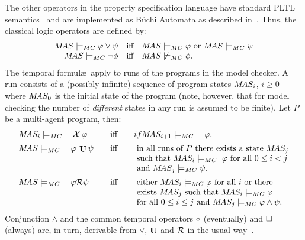 \noindent The other operators in the \ajpf{} property specification
language have standard PLTL semantics~\cite{emerson:90a} and are
implemented as B\"{u}chi Automata as described
in~\cite{Gerth:1995:SOA:645837.670574,Courcoubetis92mea}. Thus, the
classical logic operators are defined by:
$$
\begin{array}{rcl}
  M\!AS \models_{MC} \varphi \vee \psi &\text{iff}& M\!AS \models_{MC}
  \varphi \text{ or } M\!AS \models_{MC} \psi \\
  M\!AS \models_{MC} \neg \phi &\text{iff}& M\!AS \not\models_{MC} \phi.
\end{array}
$$
The temporal formul\ae\ apply to runs of the programs in the \jpf{}
model checker. A run consists of a (possibly infinite) sequence of
program states $M\!AS_i$, $i \geq 0$ where $M\!AS_0$ is the initial
state of the program (note, however, that for model checking the
number of \emph{different} states in any run is assumed to be
finite). Let $P$ be a multi-agent program, then:
$$
\begin{array}{lcl}
\MAS_i \models_{MC} \quad \next \: \varphi & \quad\text{iff}\quad&
if \MAS_{i+1} \models_{MC} \quad \varphi .\\[.5em]
%
  \MAS \models_{MC}\quad \varphi \: \luntil \psi 
   &\quad\text{iff}\quad&
    \text{ in all runs of $P$ there exists a state } \MAS_j\\
  &&  \text{ such that } \MAS_i \models_{MC}\ \varphi \text{ for all } 0 \leq i < j \\
  && \text{ and } \MAS_j \models_{MC} \psi{}.\\[.5em]
%
  \MAS \models_{MC}\quad\varphi \release \psi  
   &\quad\text{iff}\quad&
    \text{ either } \MAS_i \models_{MC} \varphi \text{ for all } i \text{ or there }\\
  && \text{ exists } \MAS_j \text{ such  that } \MAS_i \models_{MC} \varphi\\
  && \text{ for all } 0 \leq i \leq j \text{ and } \MAS_j \models_{MC} \varphi \land \psi{}.
\end{array}
$$
%
Conjunction $\land$ and the common temporal operators $\diamond$ (eventually) and $\Box$
(always) are, in turn, derivable from $\vee$, $\mathop{\mathrm{\mathbf{U}}}$ and $\mathcal{R}$ in the usual way~\cite{emerson:90a}.

